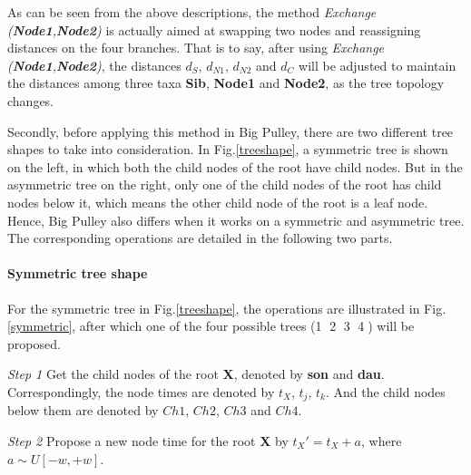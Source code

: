 \documentclass{bmcart}
\begin{document}
As can be seen from the above descriptions, the method \textit{Exchange (\textbf{Node1},\textbf{Node2})} is actually aimed at swapping two nodes and reassigning distances on the four branches. That is to say, after using \textit{Exchange (\textbf{Node1},\textbf{Node2})}, the distances $d_S$, $d_{N1}$, $d_{N2}$ and $d_{C}$ will be adjusted to maintain the distances among three taxa \textbf{Sib}, \textbf{Node1} and \textbf{Node2}, as the tree topology changes. 

Secondly, before applying this method in Big Pulley, there are two different tree shapes to take into consideration. In Fig.\ref{treeshape}, a symmetric tree is shown on the left, in which both the child nodes of the root have child nodes. But in the asymmetric tree on the right, only one of the child nodes of the root has child nodes below it, which means the other child node of the root is a leaf node. Hence, Big Pulley also differs when it works on a symmetric and asymmetric tree. The corresponding operations are detailed in the following two parts.
\paragraph*{Symmetric tree shape}

For the symmetric tree in Fig.\ref{treeshape}, the operations are illustrated in Fig.\ref{symmetric}, after which one of the four possible trees (\textcircled1 \textcircled2 \textcircled3 \textcircled4) will be proposed.

\emph{Step 1} Get the child nodes of the root \textbf{X}, denoted by \textbf{son} and \textbf{dau}. Correspondingly, the node times are denoted by $t_X$, $t_j$, $t_k$. And the child nodes below them are denoted by $Ch1$, $Ch2$, $Ch3$ and $Ch4$. 

\emph{Step 2} Propose a new node time for the root \textbf{X} by ${t_X}' = {t_X} + a$, where $a \sim U[ - w, + w]$.
\end{document}
